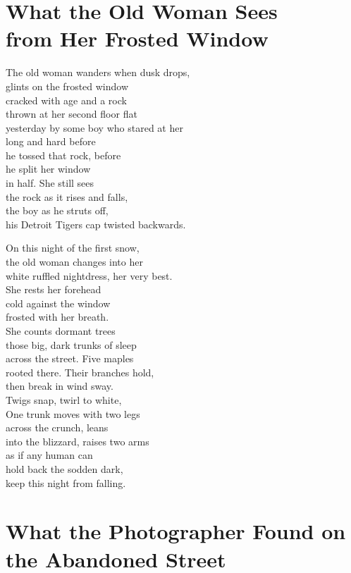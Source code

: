 \documentclass[twoside,10pt]{book}
\begin{document}
\clearpage
\section{What the Old Woman Sees\\
  from Her Frosted Window}

The old woman wanders when dusk drops,\\
glints on the frosted window\\
cracked with age and a rock\\
thrown at her second floor flat\\
yesterday by some boy who stared at her\\
long and hard before\\
he tossed that rock, before\\
he split her window\\
in half. She still sees\\
the rock as it rises and falls,\\
the boy as he struts off,\\
his Detroit Tigers cap twisted backwards.

On this night of the first snow,\\
the old woman changes into her\\
white ruffled nightdress, her very best.\\
She rests her forehead\\
cold against the window\\
frosted with her breath.\\
She counts dormant trees\\
those big, dark trunks of sleep\\
across the street. Five maples\\
rooted there. Their branches hold,\\
then break in wind sway.\\
Twigs snap, twirl to white,\\
One trunk moves with two legs\\
across the crunch, leans\\
into the blizzard, raises two arms\\
as if any human can\\
hold back the sodden dark,\\
keep this night from falling.


\clearpage
\section{What the Photographer Found
on the Abandoned Street}
\end{document}
